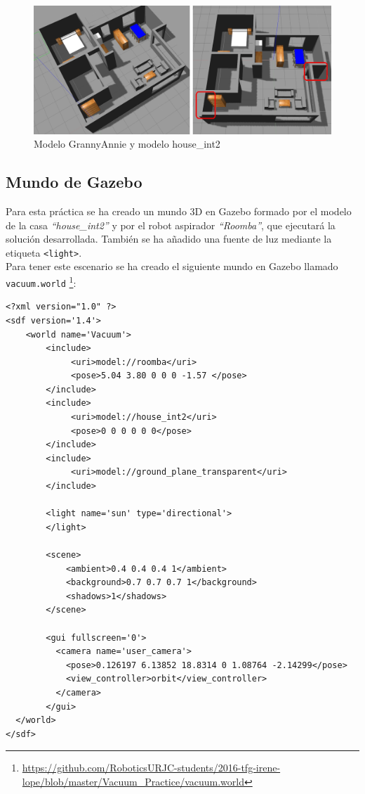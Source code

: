 \begin{figure}[H]
  \begin{center}
    \includegraphics[width=1.0\textwidth]{figures/Vacuum/casa.jpg}
		\caption{Modelo GrannyAnnie y modelo house\_int2}
		\label{fig.house_int2}
		\end{center}
\end{figure}



\subsection{Mundo de Gazebo}
Para esta práctica se ha creado un mundo 3D en Gazebo formado por el modelo de la casa \textit{``house\_int2''} y por el robot aspirador \textit{``Roomba''}, que ejecutará la solución desarrollada. También se ha añadido una fuente de luz mediante la etiqueta \texttt{<light>}.\\

Para tener este escenario se ha creado el siguiente mundo en Gazebo llamado \texttt{vacuum.world} \footnote{\url{https://github.com/RoboticsURJC-students/2016-tfg-irene-lope/blob/master/Vacuum_Practice/vacuum.world}}:

\vspace{20pt}
	\begin{lstlisting}[frame=single]
<?xml version="1.0" ?>
<sdf version='1.4'>
	<world name='Vacuum'>
    	<include>
    	     <uri>model://roomba</uri>
    	     <pose>5.04 3.80 0 0 0 -1.57 </pose>
    	</include>
    	<include>
    	     <uri>model://house_int2</uri>
    	  	 <pose>0 0 0 0 0 0</pose>
    	</include>
		<include>
    	     <uri>model://ground_plane_transparent</uri>
    	</include>
    	
    	<light name='sun' type='directional'>
    	</light>
    
		<scene>
		  	<ambient>0.4 0.4 0.4 1</ambient>
		  	<background>0.7 0.7 0.7 1</background>
		  	<shadows>1</shadows>
		</scene>
    
		<gui fullscreen='0'>
		  <camera name='user_camera'>
		    <pose>0.126197 6.13852 18.8314 0 1.08764 -2.14299</pose>
		    <view_controller>orbit</view_controller>
		  </camera>
		</gui>
  </world>
</sdf>

	\end{lstlisting}


